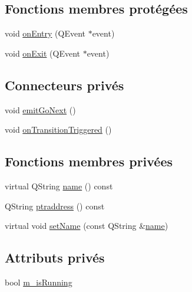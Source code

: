 \subsection*{Fonctions membres protégées}
\begin{DoxyCompactItemize}
\item 
void \hyperlink{classSimpleHotel_1_1SH__GenericState_adebdb330ff20556a54a833b15e50eacc}{on\-Entry} (Q\-Event $\ast$event)
\item 
void \hyperlink{classSimpleHotel_1_1SH__GenericState_acfcd0946dfa10d98c35abc8cd74b0429}{on\-Exit} (Q\-Event $\ast$event)
\end{DoxyCompactItemize}
\subsection*{Connecteurs privés}
\begin{DoxyCompactItemize}
\item 
void \hyperlink{classSimpleHotel_1_1SH__GenericState_a74b339fb51ef402058b66b4e580eda5a}{emit\-Go\-Next} ()
\item 
void \hyperlink{classSimpleHotel_1_1SH__GenericState_a795964c1ae04e47f1c87e316a4b49af5}{on\-Transition\-Triggered} ()
\end{DoxyCompactItemize}
\subsection*{Fonctions membres privées}
\begin{DoxyCompactItemize}
\item 
virtual Q\-String \hyperlink{classSimpleHotel_1_1SH__NamedObject_ad144716345034c91cface8f3163a799e}{name} () const 
\item 
Q\-String \hyperlink{classSimpleHotel_1_1SH__NamedObject_af64f64d8af4f899c0626974bbf15698c}{ptraddress} () const 
\item 
virtual void \hyperlink{classSimpleHotel_1_1SH__NamedObject_a1e11501093109612bb85ea24a1eba7cb}{set\-Name} (const Q\-String \&\hyperlink{classSimpleHotel_1_1SH__NamedObject_ad144716345034c91cface8f3163a799e}{name})
\end{DoxyCompactItemize}
\subsection*{Attributs privés}
\begin{DoxyCompactItemize}
\item 
bool \hyperlink{classSimpleHotel_1_1SH__GenericState_a4e4ba53c9e163eed2685cfda8745308d}{m\-\_\-is\-Running}
\end{DoxyCompactItemize}


